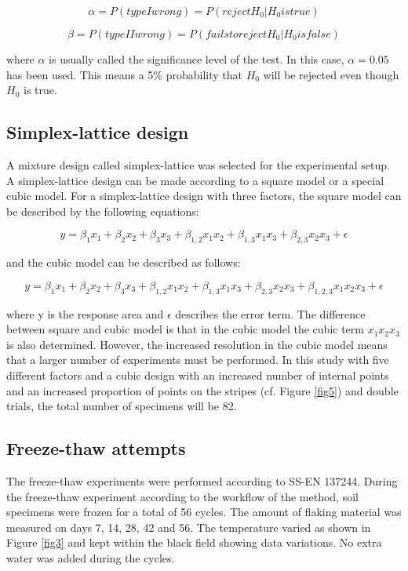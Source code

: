 \documentclass[constrmater,article,submit,pdftex,moreauthors]{Definitions/mdpi}
\begin{document}
\begin{equation}
	\alpha = P (type I wrong) = P(reject H_0 | H_0 is true)
\end{equation}

\begin{equation}
	\beta = P (type II wrong) = P(fails to reject H_0 | H_0 is false)
\end{equation}

where $\alpha$ is usually called the significance level of the test. In this case, $\alpha = 0.05 $  has been used. This means a 5\% probability that $H_0$ will be rejected even though $H_0$ is true. 

\subsection{Simplex-lattice design}
A mixture design called simplex-lattice was selected for the experimental setup. A simplex-lattice design can be made according to a square model or a special cubic model.  For a simplex-lattice design with three factors, the square model can be described by the following equations:

\begin{equation}
	y = \beta _1 x_1 +  \beta _2  x_2 +  \beta _3  x_3 + \beta _{1,2} x_1 x_2 + \beta _{1,3} x_1 x_3 + \beta _{2,3} x_2 x_3 + \epsilon
\end{equation}

and the cubic model can be described as follows:

\begin{equation}
	y = \beta _1 x_1 + \beta _2 x_2 + \beta _3 x_3 + \beta _{1,2} x_1 x_2 + \beta _{1,3} x_1 x_3 + \beta _{2,3} x_2 x_3  + \beta _{1,2,3} x_1 x_2 x_3 + \epsilon
\end{equation}

where y is the response area and $\epsilon$ describes the error term.  The difference between square and cubic model is that in the cubic model the cubic term $x_1 x_2 x_3$ is also determined. However, the increased resolution in the cubic model means that a larger number of experiments must be performed. In this study with five different factors and a cubic design with an increased number of internal points and an increased proportion of points on the stripes (cf. Figure \ref{fig5}) and double trials, the total number of specimens will be 82.

\subsection{Freeze-thaw attempts}
The freeze-thaw experiments were performed according to SS-EN 137244. During the  freeze-thaw experiment according to the workflow of the method, soil specimens were frozen for a total of 56 cycles. The amount of flaking material was measured on days 7, 14, 28, 42 and 56. The temperature varied as shown in Figure \ref{fig3} and kept within the black field showing data variations. No extra water was added during the cycles.
\end{document}
